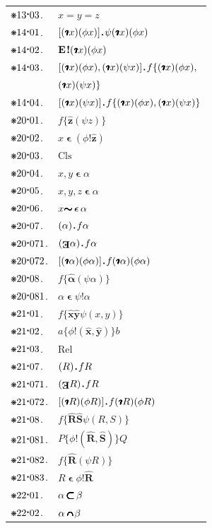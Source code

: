 \documentclass[12pt,openany,leqno,twocolumn]{book}
\newcommand{\pmast}{\text{\resizebox{!}{.75\height}{\ding{107}}}} %
\newcommand{\pmcdot}{\text{\raisebox{.05cm}{$\boldsymbol\cdot$}}} %
\newcommand{\pmd}{\hbox{\rule{.3ex}{.3ex}}} %
\newcommand{\pmdot}{\mathinner{\pmd}}
\newcommand{\pmnot}{\mathord{\ooalign{$\boldsymbol{\sim}\mkern.5mu$\hidewidth\cr$\boldsymbol{\sim}$\cr\hidewidth$\mkern.5mu\boldsymbol{\sim}$}}}
\newcommand{\pmall}[1]{(#1)}
\newcommand{\pmsome}[1]{(\text{\raisebox{.5em}{\rotatebox{180}{\textbf{E}}}}#1)} %
\newcommand{\pmhat}[1]{\mathbf{\hat{\text{$#1$}}}}
\newcommand{\pmshr}{\textbf{!}} %
\newcommand{\pmpred}[2]{#1\pmshr#2} %
\newcommand{\pmpredd}[3]{#1\pmshr(#2, #3)} %
\newcommand{\pmiota}{\ooalign{\rotatebox[origin=c]{180}{$\boldsymbol{\iota}$}\cr\hidewidth\raisebox{.0125em}{\rotatebox[origin=c]{180}{$\boldsymbol{\iota}$}}\cr\hidewidth\raisebox{.025em}{\rotatebox[origin=c]{180}{$\boldsymbol{\iota}$}}\cr\hidewidth\raisebox{.0375em}{\rotatebox[origin=c]{180}{$\boldsymbol{\iota}$}}\cr\hidewidth\raisebox{.05em}{\rotatebox[origin=c]{180}{$\boldsymbol{\iota}$}}}} %
\newcommand{\pmdsc}[1]{(\pmiota#1)} %
\newcommand{\pmexists}{\textbf{E}\hspace{.1em}\pmshr} %
\newcommand{\pmcls}[2]{\pmhat{#1}(#2)} %
\newcommand{\pmcin}{\mathop{\boldsymbol{\epsilon}}} %
\newcommand{\pmCls}{\text{Cls}} %
\newcommand{\pmcinc}{\mathop{\ooalign{$\boldsymbol{\subset}$\cr\hidewidth$\hspace{.1em}\boldsymbol{\subset}$\cr\hidewidth$\hspace{.15em}\boldsymbol{\subset}$\cr\hidewidth$\hspace{.2em}\boldsymbol{\subset}$}}} %
\newcommand{\pmccap}{\mathop{\ooalign{\scalebox{1.3}[1.75]{$\put(3, 2){\oval(4,1)[t]}\phantom{\circ}$}\cr\hidewidth\hspace{.1em}\scalebox{1.3}[1.75]{$\put(3, 2){\oval(4,1)[t]}\phantom{\circ}$}\cr\hidewidth\hspace{.2em}\scalebox{1.3}[1.75]{$\put(3, 2){\oval(4,1)[t]}\phantom{\circ}$}\cr\hidewidth\hspace{.3em}\scalebox{1.3}[1.75]{$\put(3, 2){\oval(4,1)[t]}\phantom{\circ}$}\cr\hidewidth\hspace{.4em}\scalebox{1.3}[1.75]{$\put(3, 2){\oval(4,1)[t]}\phantom{\circ}$}\cr\hidewidth\hspace{.5em}\scalebox{1.3}[1.75]{$\put(3, 2){\oval(4,1)[t]}\phantom{\circ}$}\cr\hidewidth\hspace{.6em}\scalebox{1.3}[1.75]{$\put(3, 2){\oval(4,1)[t]}\phantom{\circ}$}}}} %
\newcommand{\pmrel}[3]{\pmhat{#1}\pmhat{#2}#3} %
\newcommand{\pmrelep}[3]{#1\{#2\}#3} %
\newcommand{\pmRel}{\text{Rel}}
\begin{document}
\begin{tabular}{l l}
	$\pmast13\pmcdot03$. & $x = y = z$ \\
	$\pmast14\pmcdot01$. & $[\pmdsc{x}(\phi x)]\pmdot \psi\pmdsc{x}(\phi x)$ \\
	$\pmast14\pmcdot02$. & $\pmexists\pmdsc{x}(\phi x)$ \\
	$\pmast14\pmcdot03$. & $[\pmdsc{x}(\phi x), \pmdsc{x}(\psi x)]\pmdot f\{\pmdsc{x}(\phi x),$\\
		& \indent $\pmdsc{x}(\psi x)\}$ \\
	$\pmast14\pmcdot04$. & $[\pmdsc{x}(\psi x)]\pmdot f\{\pmdsc{x}(\phi x), \pmdsc{x}(\psi x)\}$ \\
	$\pmast20\pmcdot01$. & $f\{\pmcls{z}{\psi z}\}$ \\
	$\pmast20\pmcdot02$. & $x \mathrel{\pmcin} (\pmpred{\phi}{\pmhat{z}})$ \\
	$\pmast20\pmcdot03$. & $\pmCls$ \\
	$\pmast20\pmcdot04$. & $x, y \pmcin \alpha$ \\
	$\pmast20\pmcdot05$. & $x, y, z \pmcin \alpha$ \\
	$\pmast20\pmcdot06$. & $x \pmnot \pmcin \alpha$ \\
	$\pmast20\pmcdot07$. & $\pmall{\alpha}\pmdot f\alpha$ \\
	$\pmast20\pmcdot071$. & $\pmsome{\alpha}\pmdot f\alpha$ \\
	$\pmast20\pmcdot072$. & $[\pmdsc{\alpha}(\phi \alpha)]\pmdot f\pmdsc{\alpha}(\phi \alpha)$ \\
	$\pmast20\pmcdot08$. & $f\{\pmcls{\alpha}{\psi \alpha}\}$ \\
	$\pmast20\pmcdot081$. & $\alpha \pmcin \pmpred{\psi}{\alpha}$ \\
	$\pmast21\pmcdot01$. & $f\{\pmrel{x}{y}{\psi(x,y)}\}$ \\
	$\pmast21\pmcdot02$. & $\pmrelep{a}{\pmpredd{\phi}{\pmhat{x}}{\pmhat{y}}}{b}$ \\
	$\pmast21\pmcdot03$. & $\pmRel$ \\
	$\pmast21\pmcdot07$. & $\pmall{R}\pmdot fR$ \\
	$\pmast21\pmcdot071$. & $\pmsome{R}\pmdot fR$ \\
	$\pmast21\pmcdot072$. & $[\pmdsc{R}(\phi R)]\pmdot f\pmdsc{R}(\phi R)$ \\
	$\pmast21\pmcdot08$. & $f\{\pmrel{R}{S}{\psi(R, S)}\}$ \\
	$\pmast21\pmcdot081$. & $\pmrelep{P}{\pmpredd{\phi}{\pmhat{R}}{\pmhat{S}}}{Q}$ \\
	$\pmast21\pmcdot082$. & $f\{\pmcls{R}{\psi R}\}$ \\
	$\pmast21\pmcdot083$. & $R \pmcin \pmpred{\phi}{\pmhat{R}}$ \\
	$\pmast22\pmcdot01$. & $\alpha \pmcinc \beta$ \\
	$\pmast22\pmcdot02$. & $\alpha \pmccap \beta$ 
\end{tabular}
\end{document}
